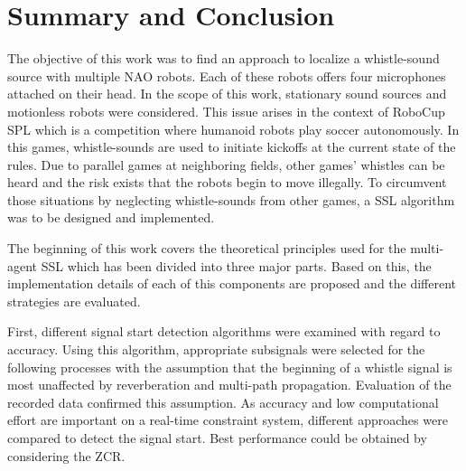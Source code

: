 \chapter{Summary and Conclusion}
\label{chap:05_conclusion}

The objective of this work was to find an approach to localize a whistle-sound
source with multiple NAO robots.
Each of these robots offers four microphones attached on their head.
In the scope of this work, stationary sound sources and motionless robots were
considered.
This issue arises in the context of \ac{RoboCup} \ac{SPL} which is a
competition where humanoid robots play soccer autonomously.
In this games, whistle-sounds are used to initiate kickoffs at the current state of the rules.
Due to parallel games at neighboring fields, other games' whistles can be heard and
the risk exists that the robots begin to move illegally.
To circumvent those situations by neglecting whistle-sounds from other
games, a \acf{SSL} algorithm was to be designed and implemented.

The beginning of this work covers the theoretical principles
used for the multi-agent \ac{SSL} which has been divided into three major parts.
Based on this, the implementation details of each of this components are proposed
and the different strategies are evaluated.

First, different signal start detection algorithms were examined with regard to accuracy.
Using this algorithm, appropriate subsignals were selected for the following processes with the
assumption that the beginning of a whistle signal is most unaffected by
reverberation and multi-path propagation.
Evaluation of the recorded data confirmed this assumption.
As accuracy and low computational effort are important on a real-time constraint
system, different approaches were compared to detect the signal start.
Best performance could be obtained by considering the \ac{ZCR}.

